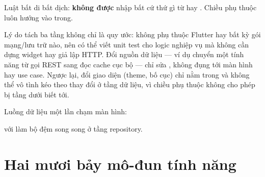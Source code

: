 Luật bất di bất dịch:  \textbf{không được} nhập bất cứ thứ gì từ
 hay . Chiều phụ thuộc luôn hướng vào trong.

Lý do tách ba tầng không chỉ là quy ước:  không phụ thuộc Flutter hay bất
kỳ gói mạng/lưu trữ nào, nên có thể viết unit test cho logic nghiệp vụ mà không cần dựng
widget hay giả lập HTTP. Đổi nguồn dữ liệu — ví dụ chuyển một tính năng từ gọi REST sang
đọc cache cục bộ — chỉ sửa , không đụng tới màn hình hay
use case. Ngược lại, đổi giao diện (theme, bố cục) chỉ nằm trong  và
không thể vô tình kéo theo thay đổi ở tầng dữ liệu, vì chiều phụ thuộc không cho phép
 bị tầng dưới biết tới.

Luồng dữ liệu một lần chạm màn hình:

\begin{center}
\end{center}

với  làm bộ đệm song song ở tầng repository.

\section{Hai mươi bảy mô-đun tính năng}

